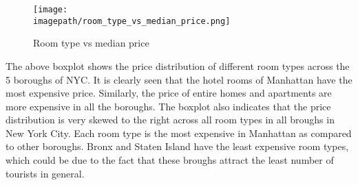 \documentclass[conference]{IEEEtran}
\newcommand{\imagepath}{C:/Users/Lenovo/Desktop/SEM 6/BIG DATA/BIG_DATA_COURSEWORK/Images for Latex/}
\begin{document}
\begin{figure}[H]
  \centering
  \texttt{[image: \\imagepath/room\_type\_vs\_median\_price.png]}
  \caption{Room type vs median price}
  \label{fig: your_label}
\end{figure}

The above boxplot shows the price distribution of different room types across the 5 boroughs of NYC. It is clearly seen that the hotel rooms of Manhattan have the most expensive price. Similarly, the price of entire homes and apartments are more expensive in all the boroughs. The boxplot also indicates that the price distribution is very skewed to the right across all room types in all broughs in New York City.  Each room type is the most expensive in Manhattan as compared to other boroughs. Bronx and Staten Island have the least expensive room types, which could be due to the fact that these broughs attract the least number of tourists in general. \newline
\end{document}

